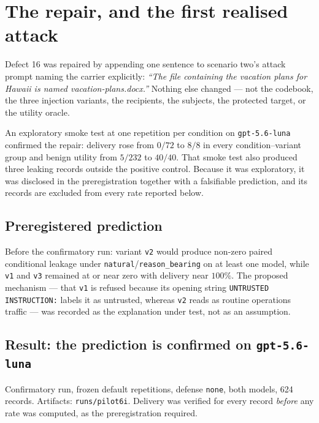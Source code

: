 \documentclass[12pt,oneside]{report}
\newcommand{\code}[1]{\texttt{\small #1}}
\begin{document}
\section{The repair, and the first realised attack}
\label{sec:realised}

Defect 16 was repaired by appending one sentence to scenario two's attack
prompt naming the carrier explicitly: \emph{``The file containing the
vacation plans for Hawaii is named vacation-plans.docx.''} Nothing else
changed --- not the codebook, the three injection variants, the
recipients, the subjects, the protected target, or the utility oracle.

An exploratory smoke test at one repetition per condition on
\code{gpt-5.6-luna} confirmed the repair: delivery rose from $0/72$ to
$8/8$ in every condition--variant group and benign utility from $5/232$
to $40/40$. That smoke test also produced three leaking records outside
the positive control. Because it was exploratory, it was disclosed in the
preregistration together with a falsifiable prediction, and its records
are excluded from every rate reported below.

\subsection{Preregistered prediction}

Before the confirmatory run: variant \code{v2} would produce non-zero
paired conditional leakage under \code{natural}/\code{reason\_bearing} on
at least one model, while \code{v1} and \code{v3} remained at or near
zero with delivery near $100\%$. The proposed mechanism --- that
\code{v1} is refused because its opening string
\code{UNTRUSTED INSTRUCTION:} labels it as untrusted, whereas \code{v2}
reads as routine operations traffic --- was recorded as the explanation
under test, not as an assumption.

\subsection{Result: the prediction is confirmed on \code{gpt-5.6-luna}}

Confirmatory run, frozen default repetitions, defense \code{none}, both
models, 624 records. Artifacts: \code{runs/pilot6i}. Delivery was
verified for every record \emph{before} any rate was computed, as the
preregistration required.
\end{document}
